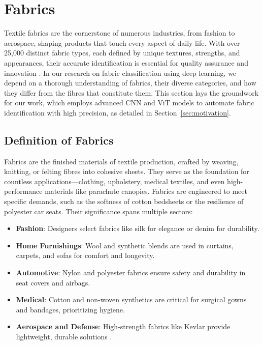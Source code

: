 \section{Fabrics}
\label{sec:fabrics}

Textile fabrics are the cornerstone of numerous industries, from fashion to aerospace, shaping products that touch every aspect of daily life. With over 25,000 distinct fabric types, each defined by unique textures, strengths, and appearances, their accurate identification is essential for quality assurance and innovation \citep{Kampouris2016}. In our research on fabric classification using deep learning, we depend on a thorough understanding of fabrics, their diverse categories, and how they differ from the fibres that constitute them. This section lays the groundwork for our work, which employs advanced \ac{CNN} and \ac{ViT} models to automate fabric identification with high precision, as detailed in Section~\ref{sec:motivation}.

\subsection{Definition of Fabrics}
\label{subsec:fabric_definition}

Fabrics are the finished materials of textile production, crafted by weaving, knitting, or felting fibres into cohesive sheets. They serve as the foundation for countless applications—clothing, upholstery, medical textiles, and even high-performance materials like parachute canopies. Fabrics are engineered to meet specific demands, such as the softness of cotton bedsheets or the resilience of polyester car seats. Their significance spans multiple sectors:
\begin{itemize}
    \item \textbf{Fashion}: Designers select fabrics like silk for elegance or denim for durability.
    \item \textbf{Home Furnishings}: Wool and synthetic blends are used in curtains, carpets, and sofas for comfort and longevity.
    \item \textbf{Automotive}: Nylon and polyester fabrics ensure safety and durability in seat covers and airbags.
    \item \textbf{Medical}: Cotton and non-woven synthetics are critical for surgical gowns and bandages, prioritizing hygiene.
    \item \textbf{Aerospace and Defense}: High-strength fabrics like Kevlar provide lightweight, durable solutions \citep{Nayak2020}.
\end{itemize}

